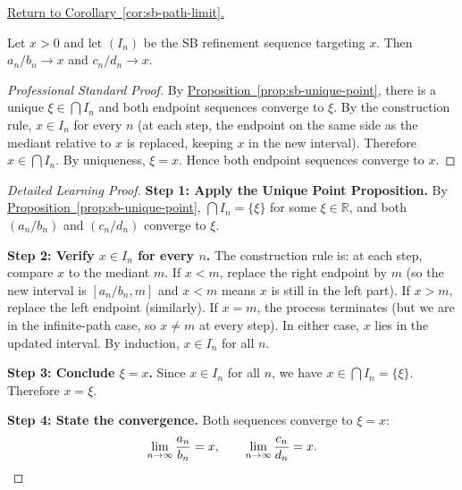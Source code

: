 
\newpage
{}
\label{prf:sb-path-limit}

\begin{remark*}[Return]
\hyperref[cor:sb-path-limit]{Return to Corollary~\ref*{cor:sb-path-limit}.}
\end{remark*}

\begin{corollary*}
Let $x > 0$ and let $(I_n)$ be the SB refinement sequence targeting $x$.
Then $a_n/b_n \to x$ and $c_n/d_n \to x$.
\end{corollary*}

\begin{proof}[Professional Standard Proof]
\LRAProofBodyStart
By \hyperref[prop:sb-unique-point]{Proposition~\ref*{prop:sb-unique-point}},
there is a unique $\xi \in \bigcap I_n$ and both endpoint sequences
converge to $\xi$.  By the construction rule, $x \in I_n$ for every $n$
(at each step, the endpoint on the same side as the mediant relative to
$x$ is replaced, keeping $x$ in the new interval).  Therefore
$x \in \bigcap I_n$.  By uniqueness, $\xi = x$.  Hence both endpoint
sequences converge to $x$.
\end{proof}

\begin{proof}[Detailed Learning Proof]
\LRAProofBodyStart
\textbf{Step 1: Apply the Unique Point Proposition.}
By \hyperref[prop:sb-unique-point]{Proposition~\ref*{prop:sb-unique-point}},
$\bigcap I_n = \{\xi\}$ for some $\xi \in \mathbb{R}$, and both
$(a_n/b_n)$ and $(c_n/d_n)$ converge to $\xi$.

\textbf{Step 2: Verify $x \in I_n$ for every $n$.}
The construction rule is: at each step, compare $x$ to the mediant $m$.
If $x < m$, replace the right endpoint by $m$ (so the new interval is
$[a_n/b_n, m]$ and $x < m$ means $x$ is still in the left part).
If $x > m$, replace the left endpoint (similarly).
If $x = m$, the process terminates (but we are in the infinite-path
case, so $x \neq m$ at every step).
In either case, $x$ lies in the updated interval.  By induction, $x \in I_n$
for all $n$.

\textbf{Step 3: Conclude $\xi = x$.}
Since $x \in I_n$ for all $n$, we have $x \in \bigcap I_n = \{\xi\}$.
Therefore $x = \xi$.

\textbf{Step 4: State the convergence.}
Both sequences converge to $\xi = x$:
\[
\lim_{n\to\infty} \frac{a_n}{b_n} = x,
\qquad
\lim_{n\to\infty} \frac{c_n}{d_n} = x.
\qedhere
\]
\end{proof}

